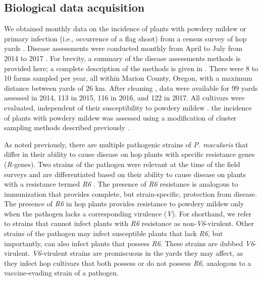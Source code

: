 \documentclass[10pt,a4paper]{article}
\begin{document}
\subsection{Biological data acquisition}

We obtained monthly data on the incidence of plants with powdery mildew or primary infection (i.e., occurrence of a flag shoot) from a census survey of hop yards . Disease assessments were conducted monthly from April to July from 2014 to 2017 . For brevity, a summary of the disease assessments methods is provided here; a complete description of the methods is given in \parencite{Gent2019a}. There were 8 to 10 farms sampled per year, all within Marion County, Oregon, with a maximum distance between yards of 26 km. After cleaning , data were available for 99 yards assessed in 2014, 113 in 2015, 116 in 2016, and 122 in 2017. All cultivars were evaluated, independent of their susceptibility to powdery mildew \parencite{Laurie2023}.  the incidence of plants with powdery mildew was assessed using a modification of cluster sampling methods described previously \parencite{Turechek2001, Turechek2004}. 

As noted previously, there are multiple pathogenic strains of \textit{P. macularis} that differ in their ability to cause disease on hop plants with specific resistance genes (\textit{R}-genes). Two strains of the pathogen were relevant at the time of the field surveys and are differentiated based on their ability to cause disease on plants with a resistance termed \textit{R6} \parencite{Padgitt-Cobb2019, Wolfenbarger2016}. The presence of \textit{R6} resistance is analogous to immunization that provides complete, but strain-specific, protection from disease. The presence of \textit{R6} in hop plants provides resistance to powdery mildew only when the pathogen lacks a corresponding virulence (\textit{V}). For shorthand, we refer to strains that cannot infect plants with \textit{R6} resistance as non-\textit{V6}-virulent. Other strains of the pathogen may infect susceptible plants that lack \textit{R6}, but importantly, can also infect plants that possess \textit{R6}. These strains are dubbed \textit{V6}-virulent. \textit{V6}-virulent strains are promiscuous in the yards they may affect, as they infect hop cultivars that both possess or do not possess \textit{R6}, analogous to a vaccine-evading strain of a pathogen.
\end{document}
